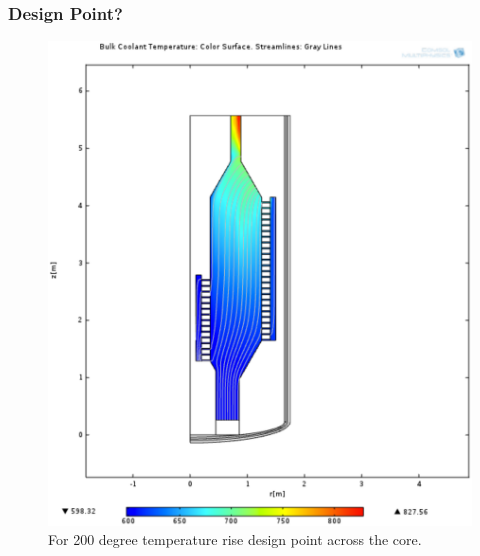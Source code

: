 \begin{frame}[fragile]
  \frametitle{Design Point?}

  \begin{figure}[htbp!]
    \begin{center}
      \includegraphics[height=0.8\textheight]{./priorart/coolant_temps_200_deg_rise.eps}
    \end{center}
    \caption{For 200 degree temperature rise design point across the core.}
    \label{fig:200degrise}
  \end{figure}
\end{frame}

